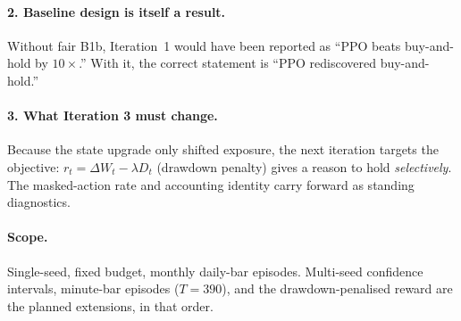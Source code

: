 \paragraph{2. Baseline design is itself a result.} Without fair B1b, Iteration~1 would have been reported as ``PPO beats buy-and-hold by $10\times$.'' With it, the correct statement is ``PPO rediscovered buy-and-hold.''

\paragraph{3. What Iteration 3 must change.} Because the state upgrade only shifted exposure, the next iteration targets the objective: $r_t = \Delta W_t - \lambda D_t$ (drawdown penalty) gives a reason to hold \emph{selectively}. The masked-action rate and accounting identity carry forward as standing diagnostics.

\paragraph{Scope.} Single-seed, fixed budget, monthly daily-bar episodes. Multi-seed confidence intervals, minute-bar episodes ($T{=}390$), and the drawdown-penalised reward are the planned extensions, in that order.
